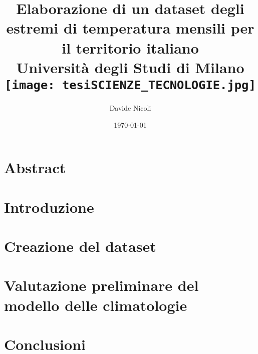 \documentclass[a4paper, 12pt]{report}
\title{
  {Elaborazione di un dataset degli estremi di temperatura mensili per il territorio italiano}\\
  {\large{Università degli Studi di Milano}}\\
  {\texttt{[image: tesiSCIENZE\_TECNOLOGIE.jpg]}}
}
\author{Davide Nicoli}
\date{\today}
\begin{document}
\maketitle


\chapter*{Abstract}

\tableofcontents


\chapter{Introduzione}\label{ch:intro}


\chapter{Creazione del dataset}


\chapter{Valutazione preliminare del modello delle climatologie}


\chapter{Conclusioni}\label{ch:conclusioni}


\clearpage
\printbibliography{}
\end{document}
